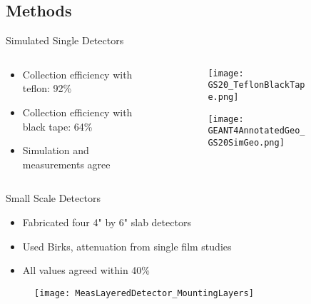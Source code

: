 \subsection{Methods}
\begin{frame}{Simulated Single Detectors}
  \begin{columns}[onlytextwidth]
    \begin{column}{0.55\textwidth}
      \begin{itemize}
        \item Collection efficiency with teflon: 92\%
        \item Collection efficiency with black tape: 64\%
        \item Simulation and measurements agree
      \end{itemize}
    \end{column}
    \begin{column}{0.4\textwidth}
      \begin{figure}
        \vspace*{-1cm}
        \begin{subfigure}[b]{\textwidth}
        \texttt{[image: GS20\_TeflonBlackTape.png]}
        \end{subfigure}
        
        \begin{subfigure}[b]{\textwidth}
        \texttt{[image: GEANT4AnnotatedGeo\_GS20SimGeo.png]}
        \end{subfigure}
      \end{figure}
    \end{column}
  \end{columns}
\end{frame}
\begin{frame}{Small Scale Detectors}
\begin{itemize}
  \item Fabricated four 4" by 6" slab detectors
  \item Used Birks, attenuation from single film studies
  \item All values agreed within 40\%
\end{itemize}
\begin{figure}
	\centering
	\texttt{[image: MeasLayeredDetector\_MountingLayers]}
\end{figure}
\end{frame}
